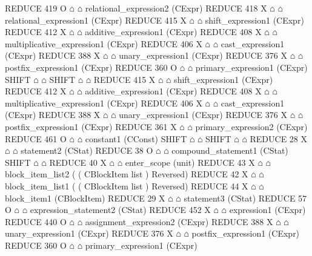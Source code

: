 \begin{isabellebody}
\begin{isamarkuptext}
\begin{isar}
                    REDUCE 419 O $\house$ $\house$ relational_expression2  (CExpr) 
                     REDUCE 418 X $\house$ $\house$ relational_expression1  (CExpr) 
                      REDUCE 415 X $\house$ $\house$ shift_expression1  (CExpr) 
                       REDUCE 412 X $\house$ $\house$ additive_expression1  (CExpr) 
                        REDUCE 408 X $\house$ $\house$ multiplicative_expression1  (CExpr) 
                         REDUCE 406 X $\house$ $\house$ cast_expression1  (CExpr) 
                          REDUCE 388 X $\house$ $\house$ unary_expression1  (CExpr) 
                           REDUCE 376 X $\house$ $\house$ postfix_expression1  (CExpr) 
                            REDUCE 360 O $\house$ $\house$ primary_expression1  (CExpr) 
                             SHIFT $\house$ $\house$ 
                     SHIFT $\house$ $\house$ 
                     REDUCE 415 X $\house$ $\house$ shift_expression1  (CExpr) 
                      REDUCE 412 X $\house$ $\house$ additive_expression1  (CExpr) 
                       REDUCE 408 X $\house$ $\house$ multiplicative_expression1  (CExpr) 
                        REDUCE 406 X $\house$ $\house$ cast_expression1  (CExpr) 
                         REDUCE 388 X $\house$ $\house$ unary_expression1  (CExpr) 
                          REDUCE 376 X $\house$ $\house$ postfix_expression1  (CExpr) 
                           REDUCE 361 X $\house$ $\house$ primary_expression2  (CExpr) 
                            REDUCE 461 O $\house$ $\house$ constant1  (CConst) 
                             SHIFT $\house$ $\house$ 
           SHIFT $\house$ $\house$ 
           REDUCE 28 X $\house$ $\house$ statement2  (CStat) 
            REDUCE 38 O $\house$ $\house$ compound_statement1  (CStat) 
             SHIFT $\house$ $\house$ 
             REDUCE 40 X $\house$ $\house$ enter_scope  (unit) 
             REDUCE 43 X $\house$ $\house$ block_item_list2  ( ( CBlockItem list )  Reversed) 
              REDUCE 42 X $\house$ $\house$ block_item_list1  ( ( CBlockItem list )  Reversed) 
              REDUCE 44 X $\house$ $\house$ block_item1  (CBlockItem) 
               REDUCE 29 X $\house$ $\house$ statement3  (CStat) 
                REDUCE 57 O $\house$ $\house$ expression_statement2  (CStat) 
                 REDUCE 452 X $\house$ $\house$ expression1  (CExpr) 
                  REDUCE 440 O $\house$ $\house$ assignment_expression2  (CExpr) 
                   REDUCE 388 X $\house$ $\house$ unary_expression1  (CExpr) 
                    REDUCE 376 X $\house$ $\house$ postfix_expression1  (CExpr) 
                     REDUCE 360 O $\house$ $\house$ primary_expression1  (CExpr) 

\end{isar}
\end{isamarkuptext}
\end{isabellebody}
